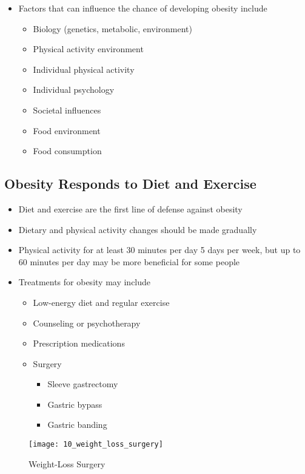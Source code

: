 \documentclass[title={Chapter 10: Achieving and Maintaining a Healthful Body Weight}]{fdsn201notes}
\begin{document}
\begin{itemize}
	\item Factors that can influence the chance of developing obesity include
	\begin{itemize}
		\item Biology (genetics, metabolic, environment)
		\item Physical activity environment
		\item Individual physical activity
		\item Individual psychology
		\item Societal influences
		\item Food environment
		\item Food consumption
	\end{itemize}
\end{itemize}

\subsection{Obesity Responds to Diet and Exercise}\label{subsec:obesity-responds-to-diet-and-exercise}
\begin{itemize}
	\item Diet and exercise are the first line of defense against obesity
	\item Dietary and physical activity changes should be made gradually
	\item Physical activity for at least 30 minutes per day 5 days per week, but up to 60 minutes per day may be more beneficial for some people
\end{itemize}

\begin{itemize}
	\item Treatments for obesity may include
	\begin{itemize}
		\item Low-energy diet and regular exercise
		\item Counseling or psychotherapy
		\item Prescription medications
		\item Surgery
		\begin{itemize}
			\item Sleeve gastrectomy
			\item Gastric bypass
			\item Gastric banding
		\end{itemize}
	\end{itemize}
\end{itemize}

\begin{figure}[H]
	\centering
	\texttt{[image: 10\_weight\_loss\_surgery]}
	\caption{Weight-Loss Surgery}
	\label{fig:weight-loss-surgery}
\end{figure}
\end{document}

